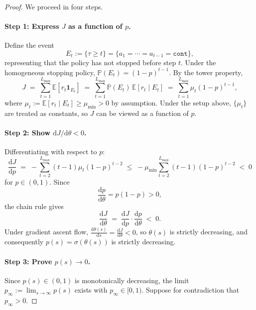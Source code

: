 \documentclass{llmxive}
\begin{document}
\begin{proof}
We proceed in four steps.

\paragraph{Step 1: Express \texorpdfstring{$J$}{J} as a function of \texorpdfstring{$p$}{p}.} Define the event
\begin{equation}
    E_t := \{\tau \geq t\} = \{a_1 = \cdots = a_{t-1} = \texttt{cont}\},
\end{equation}
representing that the policy has not stopped before step $t$. Under the homogeneous stopping policy, $\mathbb{P}(E_t) = (1-p)^{t-1}$. By the tower property,
\begin{equation}
    J \;=\; \sum_{t=1}^{L_{\max}} \mathbb{E}[r_t \mathbf{1}_{E_t}]
    \;=\; \sum_{t=1}^{L_{\max}} \mathbb{P}(E_t)\,\mathbb{E}[r_t \mid E_t]
    \;=\; \sum_{t=1}^{L_{\max}} \mu_t (1-p)^{t-1},
\end{equation}
where $\mu_t := \mathbb{E}[r_t \mid E_t] \geq \mu_{\min} > 0$ by assumption. Under the setup above, $\{\mu_t\}$ are treated as constants, so $J$ can be viewed as a function of $p$.

\paragraph{Step 2: Show \texorpdfstring{$\mathrm{d}J/\mathrm{d}\theta < 0$}{dJ/d < 0}.} Differentiating with respect to $p$:
\begin{equation}
    \frac{\mathrm{d}J}{\mathrm{d}p}
    \;=\; -\sum_{t=2}^{L_{\max}} (t-1)\mu_t (1-p)^{t-2}
    \;\leq\; -\mu_{\min} \sum_{t=2}^{L_{\max}} (t-1)(1-p)^{t-2}
    \;<\; 0
\end{equation}
for $p \in (0,1)$. Since
\begin{equation}
    \frac{\mathrm{d}p}{\mathrm{d}\theta} = p(1-p) > 0,
\end{equation}
the chain rule gives
\begin{equation}
    \frac{\mathrm{d}J}{\mathrm{d}\theta}
    \;=\; \frac{\mathrm{d}J}{\mathrm{d}p}\cdot \frac{\mathrm{d}p}{\mathrm{d}\theta}
    \;<\; 0.
\end{equation}
Under gradient ascent flow, $\frac{\mathrm{d}\theta(s)}{\mathrm{d}s} = \frac{\mathrm{d}J}{\mathrm{d}\theta}<0$, so $\theta(s)$ is strictly decreasing, and consequently $p(s)=\sigma(\theta(s))$ is strictly decreasing.

\paragraph{Step 3: Prove \texorpdfstring{$p(s) \to 0$}{p(s) 0}.} Since $p(s)\in(0,1)$ is monotonically decreasing, the limit $p_\infty := \lim_{s \to \infty} p(s)$ exists with $p_\infty \in [0,1)$. Suppose for contradiction that $p_\infty > 0$. 


\end{proof}
\end{document}
